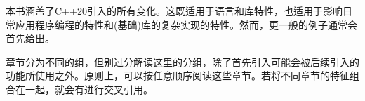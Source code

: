 本书涵盖了C++20引入的所有变化。这既适用于语言和库特性，也适用于影响日常应用程序编程的特性和(基础)库的复杂实现的特性。然而，更一般的例子通常会首先给出。

章节分为不同的组，但别过分解读这里的分组，除了首先引入可能会被后续引入的功能所使用之外。原则上，可以按任意顺序阅读这些章节。若将不同章节的特征组合在一起，就会有进行交叉引用。